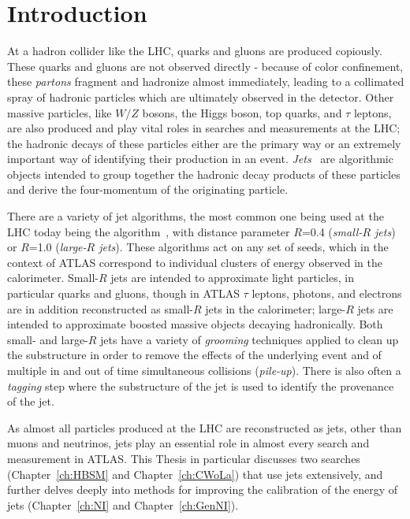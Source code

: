 \section{Introduction}
At a hadron collider like the LHC, quarks and gluons are produced copiously.
These quarks and gluons are not observed directly - because of color confinement, these \textit{partons} fragment and hadronize almost immediately, leading to a collimated spray of hadronic particles which are ultimately observed in the detector.
Other massive particles, like $W/Z$ bosons, the Higgs boson, top quarks, and $\tau$ leptons, are also produced and play vital roles in searches and measurements at the LHC; the hadronic decays of these particles either are the primary way or an extremely important way of identifying their production in an event.
\textit{Jets}~\cite{Ali:2010tw,Asquith:2018igt,Larkoski:2017jix,Salam:2009jx} are algorithmic objects intended to group together the hadronic decay products of these particles and derive the four-momentum of the originating particle.

There are a variety of jet algorithms, the most common one being used at the LHC today being the \antikt{} algorithm~\cite{Cacciari:2008gp}, with distance parameter $R$=0.4 (\textit{small-$R$ jets}) or $R$=1.0 (\textit{large-$R$ jets}).
These algorithms act on any set of seeds, which in the context of ATLAS correspond to individual clusters of energy observed in the calorimeter.
Small-$R$ jets are intended to approximate light particles, in particular quarks and gluons, though in ATLAS $\tau$ leptons, photons, and electrons are in addition reconstructed as small-$R$ jets in the calorimeter; large-$R$ jets are intended to approximate boosted massive objects decaying hadronically.
Both small- and large-$R$ jets have a variety of \textit{grooming} techniques applied to clean up the substructure in order to remove the effects of the underlying event and of multiple in and out of time simultaneous collisions (\textit{pile-up}).
There is also often a \textit{tagging} step where the substructure of the jet is used to identify the provenance of the jet.

As almost all particles produced at the LHC are reconstructed as jets, other than muons and neutrinos, jets play an essential role in almost every search and measurement in ATLAS.
This Thesis in particular discusses two searches (Chapter~\ref{ch:HBSM} and Chapter~\ref{ch:CWoLa}) that use jets extensively, and further delves deeply into methods for improving the calibration of the energy of jets (Chapter~\ref{ch:NI} and Chapter~\ref{ch:GenNI}).

